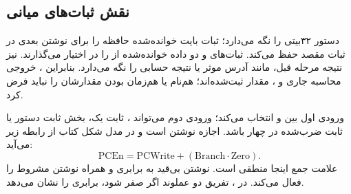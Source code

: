 \subsection{نقش ثبات‌های میانی}
 دستور ۳۲بیتی را نگه می‌دارد؛ ثبات  بایت خوانده‌شده حافظه
را برای نوشتن بعدی در ثبات مقصد حفظ می‌کند.
ثبات‌های  و  دو داده خوانده‌شده از  را
در اختیار  می‌گذارند.  نیز نتیجه مرحله قبل، مانند
آدرس موثر یا نتیجه حسابی را نگه می‌دارد.
بنابراین ، خروجی محاسبه جاری و ، مقدار ثبت‌شده‌اند؛
هم‌نام یا هم‌زمان بودن مقدارشان را نباید فرض کرد.

 ورودی اول  بین  و  انتخاب می‌کند؛
ورودی دوم می‌تواند ، ثابت یک، بخش ثابت دستور یا ثابت ضرب‌شده در چهار باشد.
 اجازه نوشتن  است و در مدل شکل کتاب از رابطه زیر می‌آید:
\begin{equation}\label{eq:mips-pcen}
\mathrm{PCEn}=\mathrm{PCWrite}+(\mathrm{Branch}\cdot\mathrm{Zero}).
\end{equation}
علامت جمع اینجا  منطقی است.  نوشتن بی‌قید به برابری
و  همراه  نوشتن مشروط را فعال می‌کند.
در ، تفریق دو عملوند اگر صفر شود، برابری را نشان می‌دهد.

